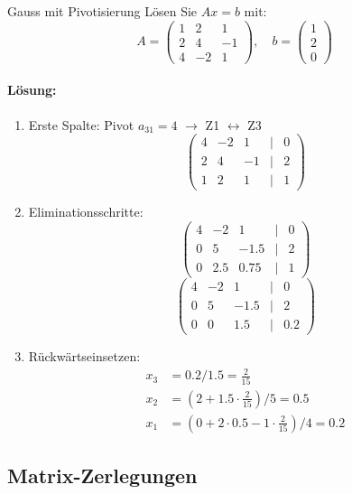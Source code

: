 \begin{example2}{Gauss mit Pivotisierung}
Lösen Sie $Ax = b$ mit:
$$A = \begin{pmatrix} 
1 & 2 & 1 \\
2 & 4 & -1 \\
4 & -2 & 1
\end{pmatrix}, \quad b = \begin{pmatrix} 1 \\ 2 \\ 0 \end{pmatrix}$$

\paragraph{Lösung:}
\begin{enumerate}
    \item Erste Spalte: Pivot $a_{31} = 4$ $\rightarrow$ Z1 $\leftrightarrow $ Z3
    $$\begin{pmatrix} 
    4 & -2 & 1 & | & 0 \\
    2 & 4 & -1 & | & 2 \\
    1 & 2 & 1 & | & 1
    \end{pmatrix}$$
    
    \item Eliminationsschritte:
    $$\begin{pmatrix} 
    4 & -2 & 1 & | & 0 \\
    0 & 5 & -1.5 & | & 2 \\
    0 & 2.5 & 0.75 & | & 1
    \end{pmatrix}$$
    $$\begin{pmatrix} 
    4 & -2 & 1 & | & 0 \\
    0 & 5 & -1.5 & | & 2 \\
    0 & 0 & 1.5 & | & 0.2
    \end{pmatrix}$$
    
    \item Rückwärtseinsetzen:
    \begin{align*}
        x_3 &= 0.2/1.5 = \frac{2}{15} \\
        x_2 &= (2 + 1.5 \cdot \frac{2}{15})/5 = 0.5 \\
        x_1 &= (0 + 2 \cdot 0.5 - 1 \cdot \frac{2}{15})/4 = 0.2
    \end{align*}
\end{enumerate}
\end{example2}

\subsection{Matrix-Zerlegungen}

